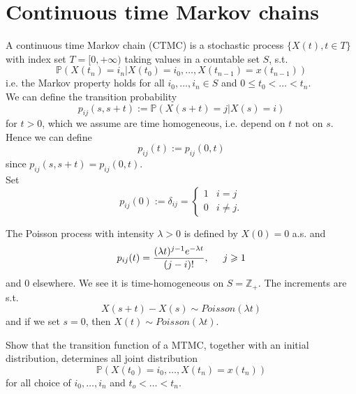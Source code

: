 \documentclass{article}
\begin{document}
	\section{Continuous time Markov chains}
	\begin{definition}
		A continuous time Markov chain (CTMC) is a stochastic process $\{X(t), t \in T\}$ with index set $T=[0,+ \infty)$ taking values in a countable set $S$, s.t. 
		\begin{equation*}
			\mathbb{P}(X(t_n)=i_n | X(t_0)=i_0, \dots, X(t_{n-1})= x(t_{n-1}))
		\end{equation*}
		i.e. the Markov property holds for all $i_0, \dots, i_n \in S$ and $0\leqslant t_0 < \dots < t_n$. \\
		We can define the transition probability 
		\begin{equation*}
			p_{ij}(s,s+t):= \mathbb{P}(X(s+t)=j|X(s)=i)
		\end{equation*}
		for $t>0$, which we assume are time homogeneous, i.e. depend on $t$ not on $s$. Hence we can define 
		\begin{equation*}
			p_{ij}(t):= p_{ij}(0,t)
		\end{equation*}
		since $p_{ij}(s,s+t)= p_{ij}(0,t)$.\\
		Set \[p_{ij}(0):=\delta_{ij}=\begin{cases}
			1 &i=j\\
			0 &i\neq j.
		\end{cases}\]
	\end{definition}
	\begin{example}
		The Poisson process with intensity $\lambda>0 $ is defined by $X(0)=0$ a.s. and 
		\begin{equation*}
			p_{ij}(t)= \frac{(\lambda t)^{j-1}e^{-\lambda t}}{(j-i)!}, \hspace{0.5 cm} j \geqslant 1
		\end{equation*}
		and $0$ elsewhere. We see it is time-homogeneous on $S = \mathbb{Z}_+$. The increments are s.t.
		\begin{equation*}
			X(s+t)-X(s) \sim Poisson (\lambda t)
		\end{equation*}
		and if we set $s=0$, then $X(t) \sim Poisson(\lambda t)$.
	\end{example}
	\begin{exercise}
		Show that the transition function of a MTMC, together with an initial distribution, determines all joint distribution 
		\begin{equation*}
			\mathbb{P}( X(t_0)=i_0, \dots, X(t_{n})= x(t_{n}))
		\end{equation*}
		for all choice of $i_0, \dots, i_n$ and $t_o <\dots < t_n$. \\
	\end{exercise}
\end{document}

